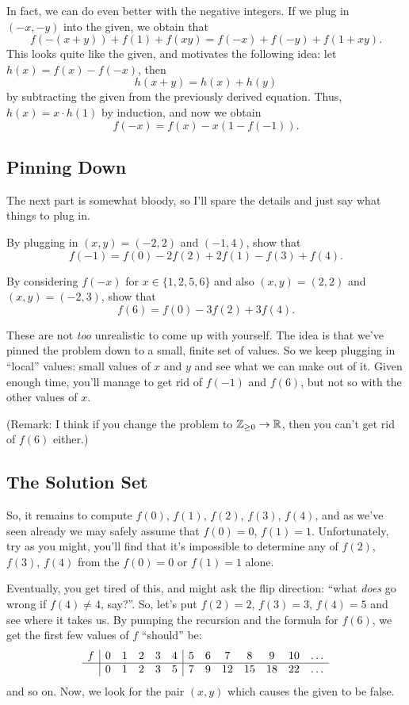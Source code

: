 \documentclass[11pt]{scrartcl}
\begin{document}
In fact, we can do even better with the negative integers.
If we plug in $(-x,-y)$ into the given, we obtain that
\[ f(-(x+y)) + f(1) + f(xy) = f(-x) + f(-y) + f(1+xy). \]
This looks quite like the given, and motivates the following idea:
let $h(x) = f(x)-f(-x)$, then
\[ h(x+y) = h(x) + h(y) \]
by subtracting the given from the previously derived equation.
Thus, $h(x) = x \cdot h(1)$ by induction, and now we obtain
\[ f(-x) = f(x) - x \left( 1-f(-1) \right). \]

\subsection{Pinning Down}
The next part is somewhat bloody, so I'll spare the details and just say what things to plug in.
\begin{exercise}
  By plugging in $(x,y)=(-2,2)$ and $(-1,4)$, show that
  \[ f(-1) = f(0) - 2f(2) + 2f(1) - f(3) + f(4). \]
\end{exercise}
\begin{exercise}
  By considering $f(-x)$ for $x\in\{1,2,5,6\}$ and also $(x,y) = (2,2)$ and $(x,y)=(-2,3)$,
  show that \[ f(6) = f(0) - 3f(2) + 3f(4). \]
\end{exercise}
These are not \emph{too} unrealistic to come up with yourself.
The idea is that we've pinned the problem down to a small, finite set of values.
So we keep plugging in ``local'' values: small values of $x$ and $y$
and see what we can make out of it.
Given enough time, you'll manage to get rid of $f(-1)$ and $f(6)$,
but not so with the other values of $x$.

(Remark: I think if you change the problem to $\mathbb Z_{\ge 0} \to \mathbb R$,
then you can't get rid of $f(6)$ either.)

\subsection{The Solution Set}
So, it remains to compute $f(0)$, $f(1)$, $f(2)$, $f(3)$, $f(4)$,
and as we've seen already we may safely assume that $f(0) = 0$, $f(1) = 1$.
Unfortunately, try as you might, you'll find that it's impossible to determine
any of $f(2)$, $f(3)$, $f(4)$ from the $f(0) = 0$ or $f(1) = 1$ alone.

Eventually, you get tired of this, and might ask the flip direction:
``what \emph{does} go wrong if $f(4) \neq 4$, say?''.
So, let's put $f(2)=2$, $f(3)=3$, $f(4) = 5$ and see where it takes us.
By pumping the recursion and the formula for $f(6)$,
we get the first few values of $f$ ``should'' be:
\[
  \begin{array}{c|ccccc|ccccccr}
    f & 0 & 1 & 2 & 3 & 4 & 5 & 6 & 7 & 8 & 9 & 10 & \dots\\ \hline
      & 0 & 1 & 2 & 3 & 5 & 7 & 9 & 12& 15& 18& 22 & \dots
  \end{array}
\]
and so on.
Now, we look for the pair $(x,y)$ which causes the given to be false.
\end{document}
